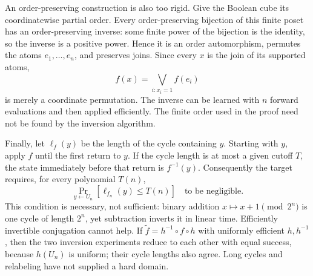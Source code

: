 \documentclass[11pt,a4paper]{article}
\numberwithin{equation}{section}
\begin{document}
An order-preserving construction is also too rigid. Give the Boolean
cube its coordinatewise partial order. Every order-preserving bijection
of this finite poset has an order-preserving inverse: some finite power
of the bijection is the identity, so the inverse is a positive power.
Hence it is an order automorphism, permutes the atoms $e_1,\ldots,e_n$,
and preserves joins. Since every $x$ is the join of its supported atoms,
\[
 f(x)=\bigvee_{i:x_i=1}f(e_i)
\]
is merely a coordinate permutation. The inverse can be learned with
$n$ forward evaluations and then applied efficiently. The finite order
used in the proof need not be found by the inversion algorithm.

Finally, let $\ell_f(y)$ be the length of the cycle containing $y$.
Starting with $y$, apply $f$ until the first return to $y$. If the cycle
length is at most a given cutoff $T$, the state immediately before that
return is $f^{-1}(y)$. Consequently the target requires, for every
polynomial $T(n)$,
\begin{equation}\label{eq:50:cycles}
 \Pr_{y\leftarrow U_n}[\ell_{f_n}(y)\le T(n)]
        \quad\text{to be negligible.}
\end{equation}
This condition is necessary, not sufficient: binary addition
$x\mapsto x+1\pmod{2^n}$ is one cycle of length $2^n$, yet subtraction
inverts it in linear time. Efficiently invertible conjugation cannot
help. If $\widetilde f=h^{-1}\circ f\circ h$ with uniformly efficient
$h,h^{-1}$, then the two inversion experiments reduce to each other
with equal success, because $h(U_n)$ is uniform; their cycle lengths
also agree. Long cycles and relabeling have not supplied a hard domain.
\end{document}
